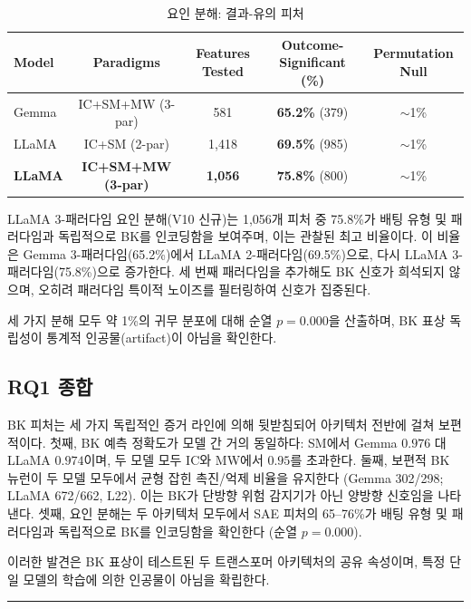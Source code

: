 \documentclass[11pt,a4paper]{article}
\begin{document}
\begin{table}[H]
\centering
\caption{요인 분해: 결과-유의 피처}\label{tab:t6}
\footnotesize
\begin{tabular}{lcccc}
\toprule
Model & Paradigms & Features Tested & Outcome-Significant (\%) & Permutation Null \\
\midrule
Gemma & IC+SM+MW (3-par) & 581 & \textbf{65.2\%} (379) & $\sim$1\% \\
LLaMA & IC+SM (2-par) & 1,418 & \textbf{69.5\%} (985) & $\sim$1\% \\
\textbf{LLaMA} & \textbf{IC+SM+MW (3-par)} & \textbf{1,056} & \textbf{75.8\%} (800) & $\sim$1\% \\
\bottomrule
\end{tabular}
\end{table}

\noindent LLaMA 3-패러다임 요인 분해(V10 신규)는 1,056개 피처 중 75.8\%가 배팅 유형 및 패러다임과 독립적으로 BK를 인코딩함을 보여주며, 이는 관찰된 최고 비율이다. 이 비율은 Gemma 3-패러다임(65.2\%)에서 LLaMA 2-패러다임(69.5\%)으로, 다시 LLaMA 3-패러다임(75.8\%)으로 증가한다. 세 번째 패러다임을 추가해도 BK 신호가 희석되지 않으며, 오히려 패러다임 특이적 노이즈를 필터링하여 신호가 집중된다.

\medskip\noindent 세 가지 분해 모두 약 1\%의 귀무 분포에 대해 순열 $p=0.000$을 산출하며, BK 표상 독립성이 통계적 인공물(artifact)이 아님을 확인한다.

\subsection{RQ1 종합}

BK 피처는 세 가지 독립적인 증거 라인에 의해 뒷받침되어 아키텍처 전반에 걸쳐 보편적이다. 첫째, BK 예측 정확도가 모델 간 거의 동일하다: SM에서 Gemma $0.976$ 대 LLaMA $0.974$이며, 두 모델 모두 IC와 MW에서 $0.95$를 초과한다. 둘째, 보편적 BK 뉴런이 두 모델 모두에서 균형 잡힌 촉진/억제 비율을 유지한다 (Gemma 302/298; LLaMA 672/662, L22). 이는 BK가 단방향 위험 감지기가 아닌 양방향 신호임을 나타낸다. 셋째, 요인 분해는 두 아키텍처 모두에서 SAE 피처의 65--76\%가 배팅 유형 및 패러다임과 독립적으로 BK를 인코딩함을 확인한다 (순열 $p=0.000$).

\medskip\noindent 이러한 발견은 BK 표상이 테스트된 두 트랜스포머 아키텍처의 공유 속성이며, 특정 단일 모델의 학습에 의한 인공물이 아님을 확립한다.

\bigskip\hrule\bigskip

\end{document}
